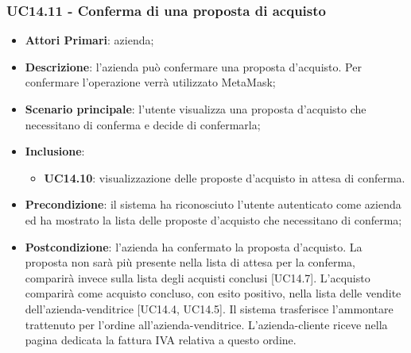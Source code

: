 \subsubsection{UC14.11 - Conferma di una proposta di acquisto}
\begin{itemize}
	\item \textbf{Attori Primari}: azienda;
	\item \textbf{Descrizione}: l'azienda può confermare una proposta d'acquisto. Per confermare l'operazione verrà utilizzato MetaMask\glo;
	\item \textbf{Scenario principale}: l'utente visualizza una proposta d'acquisto che necessitano di conferma e decide di confermarla;
	\item \textbf{Inclusione}: 
	\begin{itemize}
		\item \textbf{UC14.10}: visualizzazione delle proposte d'acquisto in attesa di conferma.
	\end{itemize}
	\item \textbf{Precondizione}: il sistema ha riconosciuto l'utente autenticato come azienda ed ha mostrato la lista delle proposte d'acquisto che necessitano di conferma;
	\item \textbf{Postcondizione}: l'azienda ha confermato la proposta d'acquisto. La proposta non sarà più presente nella lista di attesa per la conferma, comparirà invece sulla lista degli acquisti conclusi [UC14.7]. L'acquisto comparirà come acquisto concluso, con esito positivo, nella lista delle vendite dell'azienda-venditrice [UC14.4, UC14.5]. Il sistema trasferisce l'ammontare trattenuto per l'ordine all'azienda-venditrice. L'azienda-cliente riceve nella pagina dedicata la fattura IVA relativa a questo ordine.
\end{itemize}
